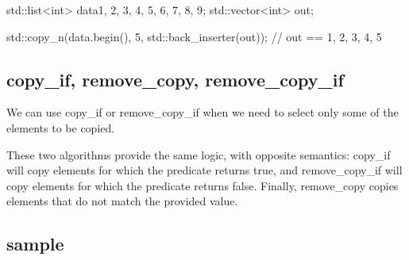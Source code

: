 \begin{box-note}
\begin{cppcode}
std::list<int> data{1, 2, 3, 4, 5, 6, 7, 8, 9};
std::vector<int> out;

std::copy_n(data.begin(), 5, std::back_inserter(out));
// out == { 1, 2, 3, 4, 5 }
\end{cppcode}
\end{box-note}

\subsection{copy\_if, remove\_copy, remove\_copy\_if}

We can use copy\_if or remove\_copy\_if when we need to select only some of the elements to be copied.



These two algorithms provide the same logic, with opposite semantics: copy\_if will copy elements for which the predicate returns true, and remove\_copy\_if will copy elements for which the predicate returns false. Finally, remove\_copy copies elements that do not match the provided value.

\begin{box-note}
\end{box-note}

\subsection{sample}

